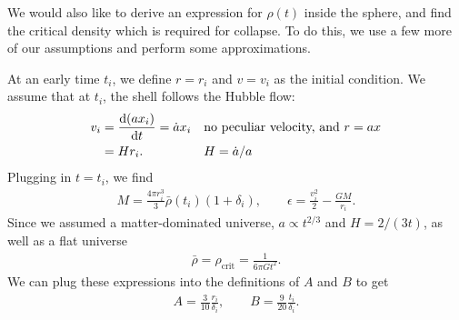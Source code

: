 We would also like to derive an expression for $\rho(t)$ inside the sphere, and find the critical density which is required for collapse. To do this, we use a few more of our assumptions and perform some approximations.

At an early time $t_i$, we define $r=r_i$ and $v = v_i$ as the initial condition. We assume that at $t_i$, the shell follows the Hubble flow:
\begin{align*}
	v_i
	&= \dv{(a x_i)}{t} 
	= \dot{a} x_i &&\text{no peculiar velocity, and } r = a x\\
	&= H r_i.
	&& H = \dot{a}/a 
\end{align*}
Plugging in $t=t_i$, we find
\begin{align*}
	M
	= \frac{4\pi r_i^3}{3}  \bar{\rho}(t_i)(1+\delta_i),
	\qquad
	\epsilon
	= \frac{v_i^2}{2}  - \frac{GM}{r_i}.
\end{align*}
Since we assumed a matter-dominated universe, $a \propto t^{2/3}$ and $H = 2/(3t)$, as well as a flat universe
\begin{align*}
	\bar{\rho}
	= \rho_\text{crit}
	= \frac{1}{6\pi G t^2}.
\end{align*}
We can plug these expressions into the definitions of $A$ and $B$ to get
\begin{align*}
	A = \frac{3}{10} \frac{r_i}{\delta_i},
	\qquad
	B = \frac{9}{20} \frac{t_i}{\delta_i}.
\end{align*}

